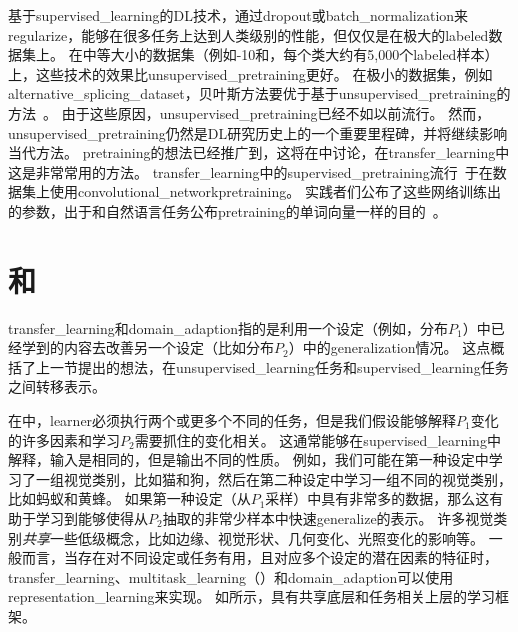 基于\gls{supervised_learning}的\gls{DL}技术，通过\gls{dropout}或\gls{batch_normalization}来\gls{regularize}，能够在很多任务上达到人类级别的性能，但仅仅是在极大的\gls{labeled}数据集上。
在中等大小的数据集（例如-10和，每个类大约有5,000个\gls{labeled}样本）上，这些技术的效果比\gls{unsupervised_pretraining}更好。
在极小的数据集，例如\gls{alternative_splicing_dataset}，贝叶斯方法要优于基于\gls{unsupervised_pretraining}的方法~\citep{Srivastava-master-small}。
由于这些原因，\gls{unsupervised_pretraining}已经不如以前流行。
然而，\gls{unsupervised_pretraining}仍然是\gls{DL}研究历史上的一个重要里程碑，并将继续影响当代方法。
\gls{pretraining}的想法已经推广到，这将在中讨论，在\gls{transfer_learning}中这是非常常用的方法。
\gls{transfer_learning}中的\gls{supervised_pretraining}流行~\citep{Oquab-et-al-CVPR2014,yosinski-nips2014}于在数据集上使用\gls{convolutional_network}\gls{pretraining}。
实践者们公布了这些网络训练出的参数，出于和自然语言任务公布\gls{pretraining}的单词向量一样的目的~\citep{collobert2011natural,Mikolov-et-al-ICLR2013}。


\section{和}
\label{sec:transfer_learning_and_domain_adaptation}
\gls{transfer_learning}和\gls{domain_adaption}指的是利用一个设定（例如，分布$P_1$）中已经学到的内容去改善另一个设定（比如分布$P_2$）中的\gls{generalization}情况。
这点概括了上一节提出的想法，在\gls{unsupervised_learning}任务和\gls{supervised_learning}任务之间转移表示。


在中，\gls{learner}必须执行两个或更多个不同的任务，但是我们假设能够解释$P_1$变化的许多因素和学习$P_2$需要抓住的变化相关。
这通常能够在\gls{supervised_learning}中解释，输入是相同的，但是输出不同的性质。
例如，我们可能在第一种设定中学习了一组视觉类别，比如猫和狗，然后在第二种设定中学习一组不同的视觉类别，比如蚂蚁和黄蜂。
如果第一种设定（从$P_1$采样）中具有非常多的数据，那么这有助于学习到能够使得从$P_2$抽取的非常少样本中快速\gls{generalize}的表示。%
许多视觉类别\emph{共享}一些低级概念，比如边缘、视觉形状、几何变化、光照变化的影响等。
一般而言，当存在对不同设定或任务有用，且对应多个设定的潜在因素的特征时，\gls{transfer_learning}、\gls{multitask_learning}（）和\gls{domain_adaption}可以使用\gls{representation_learning}来实现。
如所示，具有共享底层和任务相关上层的学习框架。

